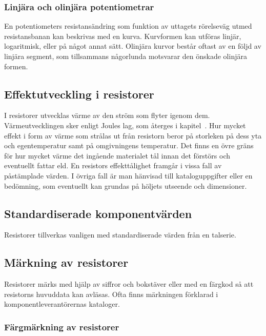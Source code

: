\subsubsection{Linjära och olinjära potentiometrar}

En potentiometers resistansändring som funktion av uttagets rörelseväg utmed
resistansbanan kan beskrivas med en kurva.
Kurvformen kan utföras linjär, logaritmisk, eller på något annat sätt.
Olinjära kurvor består oftast av en följd av linjära segment, som tillsammans
någorlunda motsvarar den önskade olinjära formen.

\subsection{Effektutveckling i resistorer}

I resistorer utvecklas värme av den ström som flyter igenom dem.
Värmeutvecklingen sker enligt Joules lag, som återges i kapitel~.
Hur mycket effekt i form av värme som strålas ut från resistorn beror på
storleken på dess yta och egentemperatur samt på omgivningens temperatur.
Det finns en övre gräns för hur mycket värme det ingående materialet tål innan
det förstörs och eventuellt fattar eld.
En resistors effekttålighet framgår i vissa fall av påstämplade värden.
I övriga fall är man hänvisad till kataloguppgifter eller en bedömning, som
eventuellt kan grundas på höljets utseende och dimensioner.

\subsection{Standardiserade komponentvärden}

Resistorer tillverkas vanligen med standardiserade värden från en talserie.

\subsection{Märkning av resistorer}
\label{färgmärkning}

Resistorer märks med hjälp av siffror och bokstäver eller med en färgkod så att
resistorns huvuddata kan avläsas.
Ofta finns märkningen förklarad i komponentleverantörernas kataloger.

\subsubsection{Färgmärkning av resistorer}

